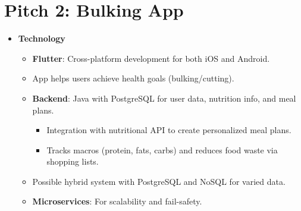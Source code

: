 \documentclass{article}
\begin{document}
\section*{Pitch 2: Bulking App}

\begin{itemize}
    \item \textbf{Technology}
    \begin{itemize}
        \item \textbf{Flutter}: Cross-platform development for both iOS and Android.
        \item App helps users achieve health goals (bulking/cutting).
        \item \textbf{Backend}: Java with PostgreSQL for user data, nutrition info, and meal plans.
        \begin{itemize}
            \item Integration with nutritional API to create personalized meal plans.
            \item Tracks macros (protein, fats, carbs) and reduces food waste via shopping lists.
        \end{itemize}
        \item Possible hybrid system with PostgreSQL and NoSQL for varied data.
        \item \textbf{Microservices}: For scalability and fail-safety.
    \end{itemize}
\end{itemize}
\end{document}

